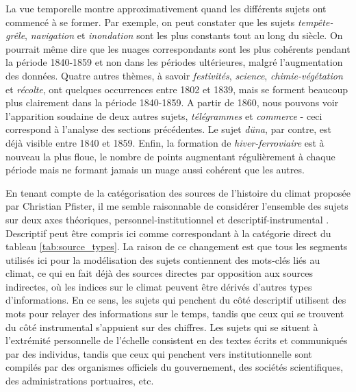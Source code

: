 \documentclass[a4paper,twoside,12pt]{article}
\begin{document}
La vue temporelle montre approximativement quand les différents sujets ont commencé à se former. Par exemple, on peut constater que les sujets \textit{tempête-grêle}, \textit{navigation} et \textit{inondation} sont les plus constants tout au long du siècle. On pourrait même dire que les nuages correspondants sont les plus cohérents pendant la période 1840-1859 et non dans les périodes ultérieures, malgré l'augmentation des données. Quatre autres thèmes, à savoir \textit{festivités}, \textit{science}, \textit{chimie-végétation} et \textit{récolte}, ont quelques occurrences entre 1802 et 1839, mais se forment beaucoup plus clairement dans la période 1840-1859. A partir de 1860, nous pouvons voir l'apparition soudaine de deux autres sujets, \textit{télégrammes} et \textit{commerce} - ceci correspond à l'analyse des sections précédentes. Le sujet \textit{düna}, par contre, est déjà visible entre 1840 et 1859. Enfin, la formation de \textit{hiver-ferroviaire} est à nouveau la plus floue, le nombre de points augmentant régulièrement à chaque période mais ne formant jamais un nuage aussi cohérent que les autres.


En tenant compte de la catégorisation des sources de l'histoire du climat proposée par Christian Pfister, il me semble raisonnable de considérer l'ensemble des sujets sur deux axes théoriques, \og personnel-institutionnel \fg{} et \og descriptif-instrumental \fg{}. \og Descriptif \fg{} peut être compris ici comme correspondant à la catégorie \og direct \fg{} du tableau \ref{tab:source_types}. La raison de ce changement est que tous les segments utilisés ici pour la modélisation des sujets contiennent des mots-clés liés au climat, ce qui en fait déjà des sources \og directes \fg{} par opposition aux sources indirectes, où les indices sur le climat peuvent être dérivés d'autres types d'informations. En ce sens, les sujets qui penchent du côté \og descriptif \fg{} utilisent des mots pour relayer des informations sur le temps, tandis que ceux qui se trouvent du côté \og instrumental \fg{} s'appuient sur des chiffres. Les sujets qui se situent à l'extrémité \og personnelle \fg{} de l'échelle consistent en des textes écrits et communiqués par des individus, tandis que ceux qui penchent vers \og institutionnelle \fg{} sont compilés par des organismes officiels du gouvernement, des sociétés scientifiques, des administrations portuaires, etc.
\end{document}
